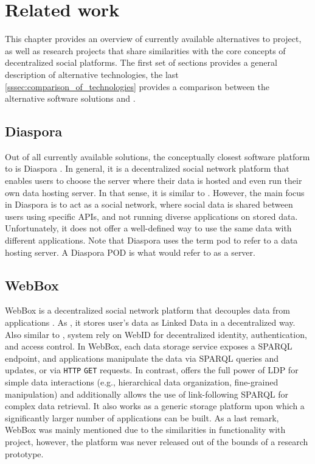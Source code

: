 \chapter{Related work}
\label{chap:num_2}

This chapter provides an overview of currently available alternatives to \solid{} project, as well as research projects that share similarities with the core concepts of decentralized social platforms. The first set of sections provides a general description of alternative technologies, the last \autoref{sssec:comparison_of_technologies} provides a comparison between the alternative software solutions and \solid{}.

\section{Diaspora}

Out of all currently available solutions, the conceptually closest software platform to \solid{} is Diaspora \cite{diaspora_paper}\cite{diaspora_site}. In general, it is a decentralized social network platform that enables users to choose the server where their data is hosted and even run their own data hosting server. In that sense, it is similar to \solid{}. However, the main focus in Diaspora is to act as a social network, where social data is shared between users using specific APIs, and not running diverse applications on stored data. Unfortunately, it does not offer a well-defined way to use the same data with different applications. Note that Diaspora uses the term pod to refer to a data hosting server. A Diaspora POD is what \solid{} would refer to as a \solid{} server.

\section{WebBox}

WebBox is a decentralized social network platform that decouples data from applications \cite{webbox}. As \solid{}, it stores user’s data as Linked Data in a decentralized way. Also similar to \solid{}, system rely on WebID for decentralized identity, authentication, and access control. In WebBox, each data storage service exposes a SPARQL endpoint, and applications manipulate the data via SPARQL queries and updates, or via \texttt{HTTP} \texttt{GET} requests. In contrast, \solid{} offers the full power of LDP for simple data interactions (e.g., hierarchical data organization, fine-grained manipulation) and additionally allows the use of link-following SPARQL for complex data retrieval. It also works as a generic storage platform upon which a significantly larger number of applications can be built. As a last remark, WebBox was mainly mentioned due to the similarities in functionality with \solid{} project, however, the platform was never released out of the bounds of a research prototype.

